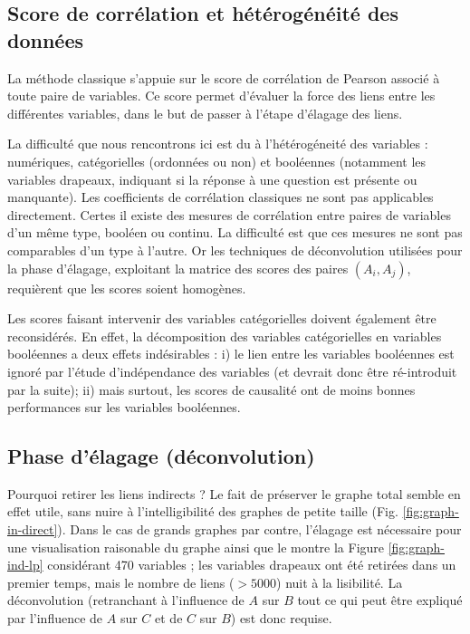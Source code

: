 \documentclass[11pt,fleqn,openany,frenchb]{book} %
\begin{document}
\subsection{Score de corrélation et hétérogénéité des données}

La méthode classique s'appuie sur le score de corrélation de Pearson associé à toute paire de variables. Ce score permet d'évaluer la force des liens entre les différentes variables, dans le but de passer à l'étape d'élagage des liens.\par

La difficulté que nous rencontrons ici est du à l'hétérogéneité des variables :  numériques, catégorielles (ordonnées ou non) et booléennes (notamment les variables drapeaux, indiquant si la réponse à une question est présente ou manquante). Les coefficients de corrélation classiques ne sont pas applicables directement. Certes il existe des mesures de corrélation entre paires de variables d'un même type, booléen ou continu. La difficulté est que ces mesures ne sont pas comparables d'un type à l'autre. Or les techniques de déconvolution utilisées pour la phase d'élagage, exploitant la matrice des scores des paires $(A_i,A_j)$, requièrent que les scores soient homogènes. \par

Les scores faisant intervenir des variables catégorielles doivent également être reconsidérés. En effet, la décomposition des variables catégorielles en variables booléennes a deux effets indésirables : i) le lien entre les variables booléennes est ignoré par l'étude d'indépendance des variables (et devrait donc être ré-introduit par la suite); ii) mais surtout, les scores de causalité ont de moins bonnes performances sur les variables booléennes.


\subsection{Phase d'élagage (déconvolution)}
Pourquoi retirer les liens indirects ? Le fait de préserver le graphe total semble en effet utile, sans nuire à l'intelligibilité des graphes de petite taille (Fig. \ref{fig:graph-in-direct}). Dans le cas de grands graphes par contre, l'élagage est nécessaire pour une visualisation raisonable du graphe ainsi que le montre la Figure \ref{fig:graph-ind-lp} considérant 470 variables ; les variables drapeaux ont été retirées dans un premier temps, mais le nombre de liens ($> 5000$) nuit à la lisibilité. La déconvolution (retranchant à l'influence de $A$ sur $B$ tout ce qui peut être expliqué par l'influence de $A$ sur $C$ et de $C$ sur $B$) est donc requise. 
\par
\end{document}

